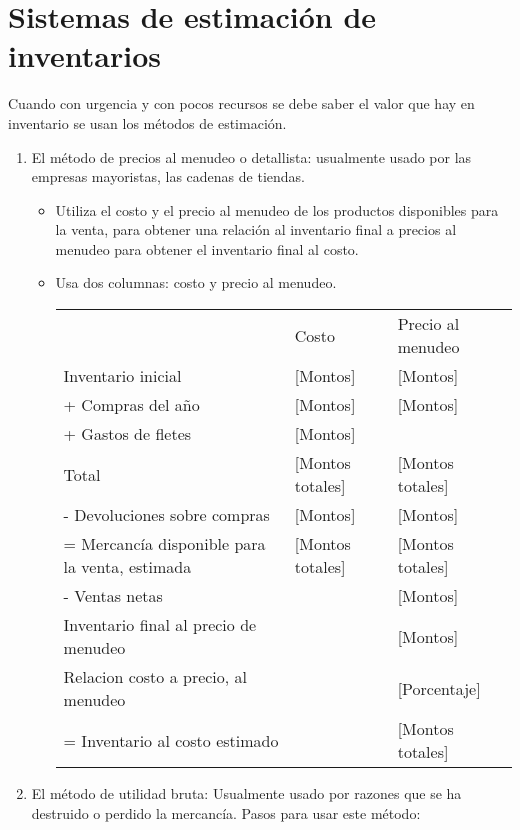 \documentclass{article}
\begin{document}
\section{Sistemas de estimación de inventarios}
Cuando con urgencia y con pocos recursos se debe saber el valor que hay en inventario se usan los métodos de estimación. 
\begin{enumerate}
    \item El método de precios al menudeo o detallista: usualmente usado por las empresas mayoristas, las cadenas de tiendas.
    \begin{itemize}
        \item Utiliza el costo y el precio al menudeo de los productos disponibles para la venta, para obtener una relación al inventario final a precios al menudeo para obtener el inventario final al costo.
        \item Usa dos columnas: costo y precio al menudeo. \newline 
        \begin{center}
            \begin{tabular}{ | p{5cm} | p{5cm} | p{5cm} | }
                \hline
                & Costo & Precio al menudeo \\ 
               Inventario inicial &  [Montos] & [Montos]\\
               + Compras del año & [Montos] & [Montos] \\ 
               + Gastos de fletes & [Montos] & \\ 
               Total & [Montos totales] & [Montos totales] \\ 
               - Devoluciones sobre compras & [Montos] & [Montos] \\ 
               = Mercancía disponible para la venta, estimada & [Montos totales] & [Montos totales] \\ 
               - Ventas netas & & [Montos] \\ 
               Inventario final al precio de menudeo & & [Montos] \\ 
               Relacion costo a precio, al menudeo & & [Porcentaje] \\
               = Inventario al costo estimado & & [Montos totales] \\ 
                \hline
               \end{tabular}
        \end{center}
    \end{itemize}
    \item El método de utilidad bruta: Usualmente usado por razones que se ha destruido o perdido la mercancía. Pasos para usar este método:

\end{enumerate}
\end{document}
